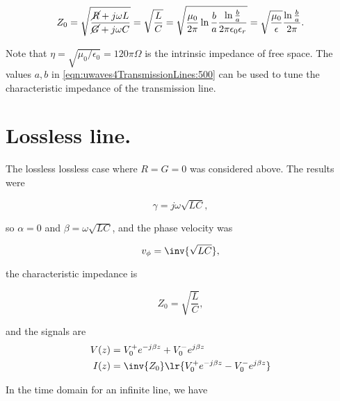 {\begin{dmath}\label{eqn:uwaves4TransmissionLines:500}
Z_0 
= \sqrt{ \frac{\cancel{R} + j \omega L}{\cancel{G} + j \omega C} } 
= \sqrt{ \frac{L}{C} }
= \sqrt{
\frac{\mu_0}{ 2 \pi } \ln \frac{b}{a}
\frac{ \ln \frac{b}{a} } 
{2 \pi \epsilon_0 \epsilon_r }
}
=
\sqrt{ \frac{\mu_0}{\epsilon} } \frac{ \ln \frac{b}{a} }{ 2 \pi }.
\end{dmath}

Note that \( \eta = \sqrt{\mu_0/\epsilon_0} = 120 \pi \Omega \) is the intrinsic impedance of free space.  The values \( a, b \) in \cref{eqn:uwaves4TransmissionLines:500} can be used to tune the characteristic impedance of the transmission line.

} %

\section{Lossless line.}

The lossless lossless case where \( R = G = 0 \) was considered above.  The results were

\begin{dmath}\label{eqn:uwaves4TransmissionLines:540}
\gamma = j \omega \sqrt{ L C },
\end{dmath}

so \( \alpha = 0 \) and \( \beta = \omega \sqrt{LC} \), and the phase velocity was

\begin{dmath}\label{eqn:uwaves4TransmissionLines:560}
v_\phi = \inv{\sqrt{LC}},
\end{dmath}

the characteristic impedance is

\begin{dmath}\label{eqn:uwaves4TransmissionLines:580}
Z_0 = \sqrt{\frac{L}{C}},
\end{dmath}

and the signals are
\begin{equation}\label{eqn:uwaves4TransmissionLines:600}
\begin{aligned}
V(z) &= V_0^{+} e^{-j \beta z} + V_0^{-} e^{j \beta z} \\
I(z) &= \inv{Z_0} \lr{ V_0^{+} e^{-j \beta z} - V_0^{-} e^{j \beta z} } 
\end{aligned}
\end{equation}

In the time domain for an infinite line, we have

